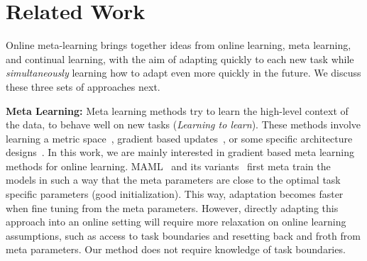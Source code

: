 \section{Related Work}

Online meta-learning brings together ideas from online learning, meta learning, and continual learning, with the aim of adapting quickly to each new task while \emph{simultaneously} learning how to adapt even more quickly in the future. We discuss these three sets of approaches next.


\noindent \textbf{Meta Learning:} Meta learning methods try to learn the high-level context of the data, to behave well on new tasks (\emph{Learning to learn}). These methods involve learning a metric space~\citep{koch2015siamese, vinyals2016matching, snell2017prototypical, yang2017learning}, gradient based updates~\citep{finn2017model, li2017meta, park2019meta, nichol2018first, nichol2018reptile}, or some specific architecture designs~\citep{santoro2016meta, munkhdalai2017meta, ravi2016optimization}.
In this work, we are mainly interested in gradient based meta learning methods for online learning. MAML~\citep{finn2017model} and its variants~\citep{nichol2018first, nichol2018reptile, li2017meta, park2019meta, antoniou2018train} first meta train the models in such a way that the meta parameters are close to the optimal task specific parameters (good initialization). This way, adaptation becomes faster when fine tuning from the meta parameters. However, directly adapting this approach into an online setting will require more relaxation on online learning assumptions, such as access to task boundaries and resetting back and froth from meta parameters. Our method does not require knowledge of task boundaries.




